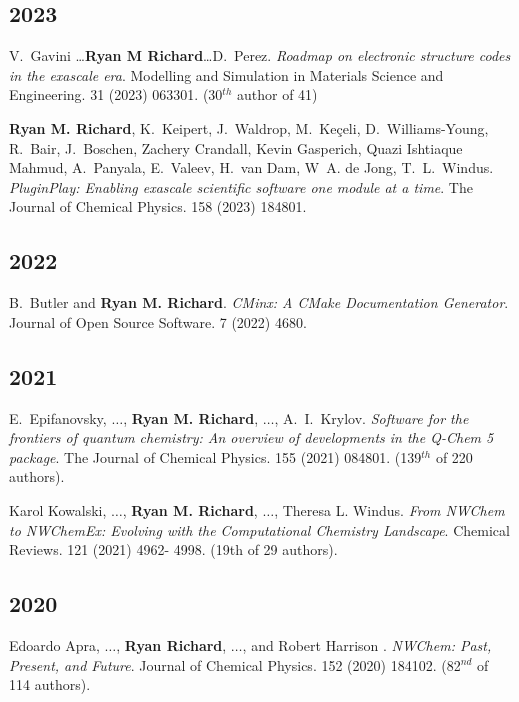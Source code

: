 \begin{etaremune}
	\subsection{2023}
	\item{V.~Gavini \ldots \textbf{Ryan M Richard}\ldots D.~Perez.
	      \textit{Roadmap on electronic structure codes in the exascale era}.
		  Modelling and Simulation in Materials Science and Engineering. 31
		  (2023) 063301. (30$^{th}$ author of 41)
	}
	\item{\textbf{Ryan M. Richard}, K.~Keipert, J.~Waldrop,
	      M.~Keçeli, D.~Williams-Young, R.~Bair, J.~Boschen,
		  Zachery Crandall, Kevin Gasperich, Quazi Ishtiaque Mahmud,
		  A.~Panyala, E.~Valeev, H.~van Dam, W~A. de Jong,
		  T.~L.~Windus. \textit{PluginPlay: Enabling exascale scientific
		  software one module at a time}. The Journal of Chemical Physics. 158
		  (2023) 184801.
	}

	\subsection{2022}
	\item{B.~Butler and \textbf{Ryan M. Richard}. \textit{CMinx: A CMake
	      Documentation Generator}. Journal of Open Source Software. 7 (2022)
		  4680.
	}

	\subsection{2021}
	\item{E.~Epifanovsky, $\ldots$, \textbf{Ryan M. Richard}, $\ldots$,
	      A.~I.~Krylov. \textit{Software for the frontiers of quantum 
		  chemistry: An overview of developments in the Q-Chem 5 package}. The 
		  Journal of Chemical Physics. 155 (2021) 084801. (139$^{th}$ of 220 
		  authors).}
	\item{Karol Kowalski, $\ldots$, \textbf{Ryan M. Richard}, $\ldots$, Theresa 
	      L. Windus. \textit{From NWChem to NWChemEx: Evolving with the 
		  Computational Chemistry Landscape}. Chemical Reviews. 121 (2021) 4962-
		  4998. (19th of 29 authors).}
	
	\subsection{2020}
	\item{Edoardo Apra, $\ldots$, \textbf{Ryan Richard}, $\ldots$, and Robert 
	      Harrison . \textit{NWChem: Past, Present, and Future}. Journal of 
		  Chemical Physics. 152 (2020) 184102. (82$^{nd}$ of 114 authors).}


\end{etaremune}
